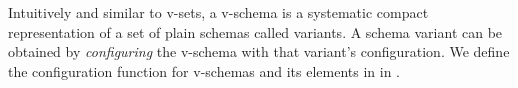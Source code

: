 Intuitively and similar to v-sets, a v-schema is a systematic  
compact representation of a set of plain schemas called variants.
A schema variant can be obtained 
by \emph{configuring} the v-schema with that variant's configuration.
We define the configuration function for v-schemas and its elements in  in .


